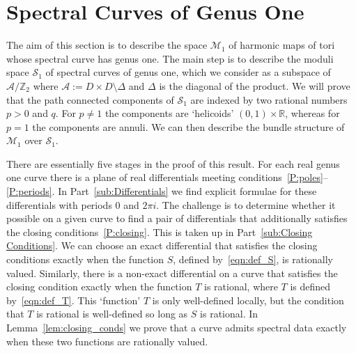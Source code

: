 \documentclass{article}
\numberwithin{equation}{section}
\numberwithin{figure}{section}
\newcommand{\iu}{i}
\newcommand{\R}{\mathbb{R}}
\begin{document}
\section{Spectral Curves of Genus One}\label{sec:Genus One}

The aim of this section is to describe the space $\mathcal{M}_1$ of harmonic maps of tori whose spectral curve has genus one. The main step is to describe the moduli space $\mathcal{S}_1$ of spectral curves of genus one, which we consider as a subspace of $\mathcal{A}/\mathbb{Z}_2$ where $\mathcal{A} := D\times D\setminus \Delta$ and $\Delta$ is the diagonal of the product. 
We will prove that the path connected components of $\mathcal{S}_1$ are indexed by two rational numbers $p > 0$ and $q$. For $p\neq 1$ the components are `helicoids' $(0,1)\times \R$, whereas for $p=1$ the components are annuli. We can then describe the bundle structure of $\mathcal{M}_1$ over $\mathcal{S}_1$.

There are essentially five stages in the proof of this result. 
For each real genus one curve there is a plane of real differentials meeting conditions~\ref{P:poles}--\ref{P:periods}. In Part~\ref{sub:Differentials} we find explicit formulae for these differentials with periods $0$ and $2\pi\iu$. 
The challenge is to determine whether it possible on a given curve to find a pair of differentials that additionally satisfies the closing conditions~\ref{P:closing}. This is taken up in Part~\ref{sub:Closing Conditions}.
We can choose an exact differential that satisfies the closing conditions exactly when the function $S$, defined by~\eqref{eqn:def_S}, is rationally valued.
Similarly, there is a non-exact differential on a curve that satisfies the closing condition exactly when the function $T$ is rational, where $T$ is defined by~\eqref{eqn:def_T}. This `function' $T$ is only well-defined locally, but the condition that $T$ is rational is well-defined so long as $S$ is rational. In Lemma~\ref{lem:closing_conds} we prove that a curve admits spectral data exactly when these two functions are rationally valued.
\end{document}
